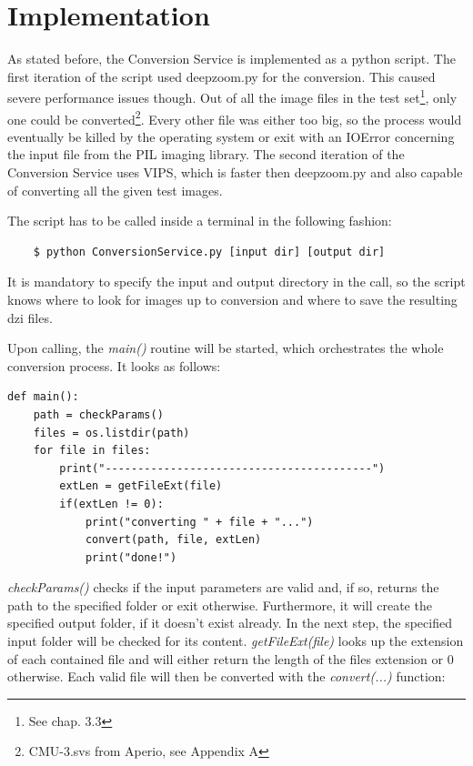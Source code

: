 \section{Implementation}

As stated before, the Conversion Service is implemented as a python script. The first iteration of the script used deepzoom.py for the conversion. This caused severe performance issues though. Out of all the image files in the test set\footnote{See chap. 3.3}, only one could be converted\footnote{CMU-3.svs from Aperio, see Appendix A}. Every other file was either too big, so the process would eventually be killed by the operating system or exit with an IOError concerning the input file from the PIL imaging library. The second iteration of the Conversion Service uses VIPS, which is faster then deepzoom.py and also capable of converting all the given test images.

The script has to be called inside a terminal in the following fashion:

\begin{lstlisting}
	$ python ConversionService.py [input dir] [output dir]
\end{lstlisting}

It is mandatory to specify the input and output directory in the call, so the script knows where to look for images up to conversion and where to save the resulting dzi files.

Upon calling, the \emph{main()} routine will be started, which orchestrates the whole conversion process. It looks as follows:

\begin{lstlisting}[frame=single]
def main():
	path = checkParams()
	files = os.listdir(path)
	for file in files:
		print("-----------------------------------------")
		extLen = getFileExt(file)
		if(extLen != 0):
			print("converting " + file + "...")
			convert(path, file, extLen)
			print("done!")
\end{lstlisting}

\emph{checkParams()} checks if the input parameters are valid and, if so, returns the path to the specified folder or exit otherwise. Furthermore, it will create the specified output folder, if it doesn't exist already. In the next step, the specified input folder will be checked for its content. \emph{getFileExt(file)} looks up the extension of each contained file and will either return the length of the files extension or $0$ otherwise. Each valid file will then be converted with the \emph{convert(...)} function:

